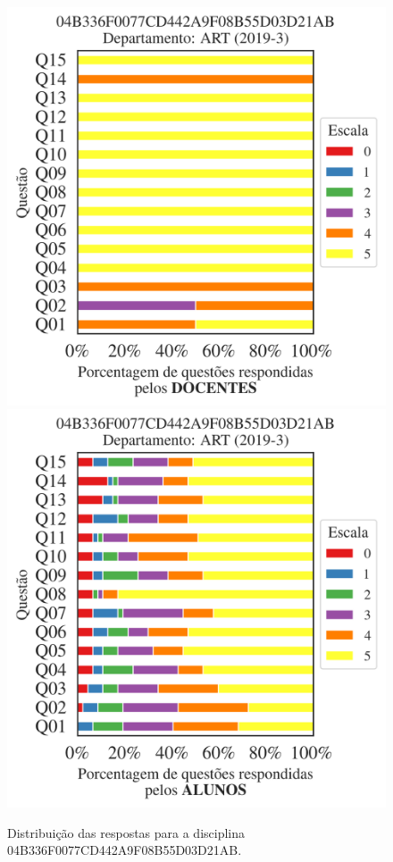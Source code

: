 \documentclass[a4paper,10pt]{article}
\begin{document}
\begin{figure}[h]
\centering
\includegraphics[width=0.485\linewidth]{analise_disciplina_departamento_ART_04B336F0077CD442A9F08B55D03D21AB_docentes.png}
\includegraphics[width=0.485\linewidth]{analise_disciplina_departamento_ART_04B336F0077CD442A9F08B55D03D21AB_alunos.png}
\caption{\label{fig:analise_geral_departamento}                Distribuição das respostas para a disciplina 04B336F0077CD442A9F08B55D03D21AB. }
\end{figure}
\end{document}
